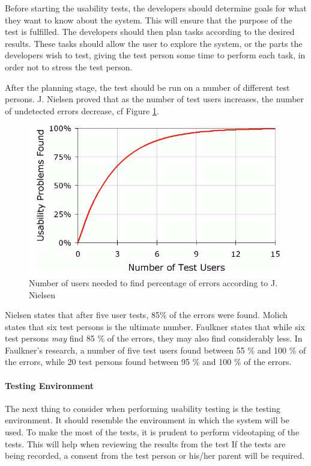 Before starting the usability tests, the developers should determine goals for what they want to know about the system\cite{isosoftwareengineering}. This will ensure that the purpose of the test is fulfilled. The developers should then plan tasks according to the desired results. These tasks should allow the user to explore the system, or the parts the developers wish to test, giving the test person some time to perform each task, in order not to stress the test person. 

After the planning stage, the test should be run on a number of different test persons. J. Nielsen\cite{nielsennumberoftests} proved that as the number of test users increases, the number of undetected errors decrease, cf Figure \ref{fig:numberoftests}. 



 \begin{figure}
 		\centering
 			\includegraphics[scale=0.4]{Pictures/app-screenshots/numberoftests.png}
 		\caption{Number of users needed to find percentage of errors according to J. Nielsen\cite{nielsennumberoftests}}
 		 		\label{fig:numberoftests}
 \end{figure}


Nielsen states that after five user tests, 85\% of the errors were found\cite{nielsennumberoftests}. Molich states that six test persons is the ultimate number\cite{molich2008usable}. Faulkner states that while six test persons \textit{may} find 85 \% of the errors, they may also find considerably less\cite{faulkner2003beyond}. In Faulkner's research, a number of five test users found between 55 \% and 100 \% of the errors, while 20 test persons found between 95 \% and 100 \% of the errors. 

\paragraph{Testing Environment}
\label{par:testingenvironment}
The next thing to consider when performing usability testing is the testing environment. It should resemble the environment in which the system will be used. To make the most of the tests, it is prudent to perform videotaping of the tests. This will help when reviewing the results from the test If the tests are being recorded, a consent from the test person or his/her parent will be required.

